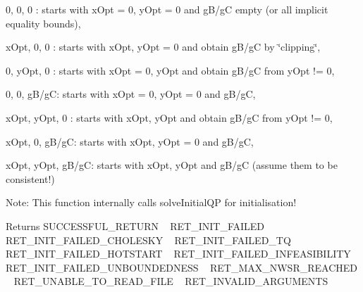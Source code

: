 \begin{DoxyEnumerate}
\item 0, 0, 0 \+: starts with x\+Opt = 0, y\+Opt = 0 and g\+B/gC empty (or all implicit equality bounds), ~\newline

\item x\+Opt, 0, 0 \+: starts with x\+Opt, y\+Opt = 0 and obtain g\+B/gC by \char`\"{}clipping\char`\"{}, ~\newline

\item 0, y\+Opt, 0 \+: starts with x\+Opt = 0, y\+Opt and obtain g\+B/gC from y\+Opt != 0, ~\newline

\item 0, 0, g\+B/gC\+: starts with x\+Opt = 0, y\+Opt = 0 and g\+B/gC, ~\newline

\item x\+Opt, y\+Opt, 0 \+: starts with x\+Opt, y\+Opt and obtain g\+B/gC from y\+Opt != 0, ~\newline

\item x\+Opt, 0, g\+B/gC\+: starts with x\+Opt, y\+Opt = 0 and g\+B/gC, ~\newline

\item x\+Opt, y\+Opt, g\+B/gC\+: starts with x\+Opt, y\+Opt and g\+B/gC (assume them to be consistent!)
\end{DoxyEnumerate}

Note\+: This function internally calls solve\+Initial\+QP for initialisation!

\begin{DoxyReturn}{Returns}
S\+U\+C\+C\+E\+S\+S\+F\+U\+L\+\_\+\+R\+E\+T\+U\+RN ~\newline
 R\+E\+T\+\_\+\+I\+N\+I\+T\+\_\+\+F\+A\+I\+L\+ED ~\newline
 R\+E\+T\+\_\+\+I\+N\+I\+T\+\_\+\+F\+A\+I\+L\+E\+D\+\_\+\+C\+H\+O\+L\+E\+S\+KY ~\newline
 R\+E\+T\+\_\+\+I\+N\+I\+T\+\_\+\+F\+A\+I\+L\+E\+D\+\_\+\+TQ ~\newline
 R\+E\+T\+\_\+\+I\+N\+I\+T\+\_\+\+F\+A\+I\+L\+E\+D\+\_\+\+H\+O\+T\+S\+T\+A\+RT ~\newline
 R\+E\+T\+\_\+\+I\+N\+I\+T\+\_\+\+F\+A\+I\+L\+E\+D\+\_\+\+I\+N\+F\+E\+A\+S\+I\+B\+I\+L\+I\+TY ~\newline
 R\+E\+T\+\_\+\+I\+N\+I\+T\+\_\+\+F\+A\+I\+L\+E\+D\+\_\+\+U\+N\+B\+O\+U\+N\+D\+E\+D\+N\+E\+SS ~\newline
 R\+E\+T\+\_\+\+M\+A\+X\+\_\+\+N\+W\+S\+R\+\_\+\+R\+E\+A\+C\+H\+ED ~\newline
 R\+E\+T\+\_\+\+U\+N\+A\+B\+L\+E\+\_\+\+T\+O\+\_\+\+R\+E\+A\+D\+\_\+\+F\+I\+LE ~\newline
 R\+E\+T\+\_\+\+I\+N\+V\+A\+L\+I\+D\+\_\+\+A\+R\+G\+U\+M\+E\+N\+TS 
\end{DoxyReturn}

